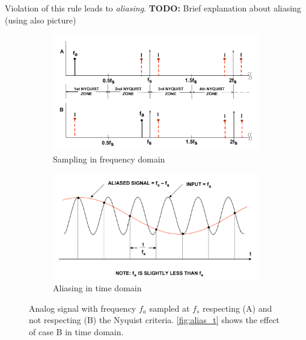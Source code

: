 Violation of this rule leads to \textit{aliasing}.
\textbf{TODO:} Brief explanation about aliasing (using also picture)


\begin{figure}[tbh]
	\centering
	\begin{subfigure}{\textwidth}
		\centering
		\includegraphics[width=\linewidth]{chap/02-theory/img/alias_f}  
		\caption{Sampling in frequency domain}
		\label{fig:alias_f}
	\end{subfigure}
	\begin{subfigure}{\textwidth}
		\centering
		\includegraphics[width=\linewidth]{chap/02-theory/img/alias_t}  
		\caption{Aliasing in time domain}
		\label{fig:alias_t}
	\end{subfigure}
	\caption[Aliasing]{Analog signal with frequency $f_a$ sampled at $f_s$ respecting (A) and not respecting (B) the Nyquist criteria. \autoref{fig:alias_t} shows the effect of case B in time domain. \cite{walt}}
\end{figure}


